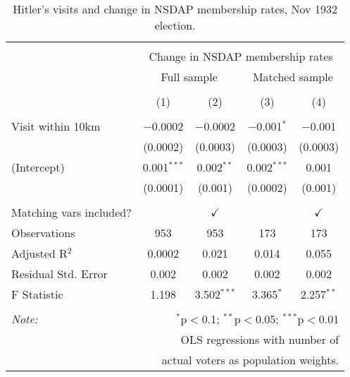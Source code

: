 
\begin{table}[!htbp] \centering 
  \caption{Hitler's visits and change in NSDAP membership rates, Nov 1932 election.} 
  \label{tab:ols-d_p_members-3} 
\begin{tabular}{@{\extracolsep{5pt}}lcccc} 
\\[-1.8ex]\hline 
\hline \\[-1.8ex] 
 & \multicolumn{4}{c}{Change in NSDAP membership rates} \\ 
\cline{2-5} 
 & \multicolumn{2}{c}{Full sample} & \multicolumn{2}{c}{Matched sample} \\ 
\\[-1.8ex] & (1) & (2) & (3) & (4)\\ 
\hline \\[-1.8ex] 
 Visit within 10km & $-$0.0002 & $-$0.0002 & $-$0.001$^{*}$ & $-$0.001 \\ 
  & (0.0002) & (0.0003) & (0.0003) & (0.0003) \\ 
  (Intercept) & 0.001$^{***}$ & 0.002$^{**}$ & 0.002$^{***}$ & 0.001 \\ 
  & (0.0001) & (0.001) & (0.0002) & (0.001) \\ 
 \hline \\[-1.8ex] 
Matching vars included? &  & \multicolumn{1}{c}{$\checkmark$} &  & \multicolumn{1}{c}{$\checkmark$} \\ 
Observations & 953 & 953 & 173 & 173 \\ 
Adjusted R$^{2}$ & 0.0002 & 0.021 & 0.014 & 0.055 \\ 
Residual Std. Error & 0.002 & 0.002 & 0.002 & 0.002 \\ 
F Statistic & 1.198 & 3.502$^{***}$ & 3.365$^{*}$ & 2.257$^{**}$ \\ 
\hline 
\hline \\[-1.8ex] 
\textit{Note:}  & \multicolumn{4}{r}{$^{*}$p$<$0.1; $^{**}$p$<$0.05; $^{***}$p$<$0.01} \\ 
 & \multicolumn{4}{r}{OLS regressions with number of} \\ 
 & \multicolumn{4}{r}{actual voters as population weights.} \\ 
\end{tabular} 
\end{table} 
